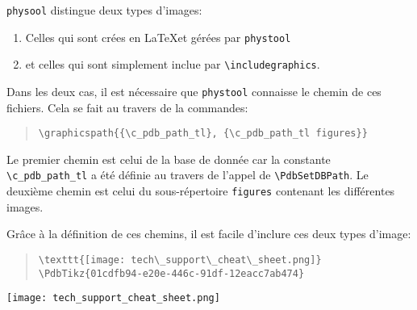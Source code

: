 \begin{theory}[title=Inclusion d'image]
	\verb|physool| distingue deux types d'images:
	\begin{enumerate}
		\item Celles qui sont crées en \LaTeX et gérées par \verb|phystool|
		\item et celles qui sont simplement inclue par \verb|\includegraphics|.
	\end{enumerate}

	Dans les deux cas, il est nécessaire que \verb|phystool| connaisse le
	chemin de ces fichiers. Cela se fait au travers de la commandes:
	\begin{quote}
		\verb|\graphicspath{{\c_pdb_path_tl}, {\c_pdb_path_tl figures}}|
	\end{quote}
	Le premier chemin est celui de la base de donnée car la constante
	\verb|\c_pdb_path_tl| a été définie au travers de l'appel de
	\verb|\PdbSetDBPath|. Le deuxième chemin est celui du sous-répertoire
	\verb|figures| contenant les différentes images.

	Grâce à la définition de ces chemins, il est facile d'inclure ces deux
	types d'image:
	\begin{quote}
		\verb|\texttt{[image: tech\_support\_cheat\_sheet.png]}|
		\verb|\PdbTikz{01cdfb94-e20e-446c-91df-12eacc7ab474}|
	\end{quote}

	\begin{center}
		\texttt{[image: tech\_support\_cheat\_sheet.png]}
	\end{center}
\end{theory}
